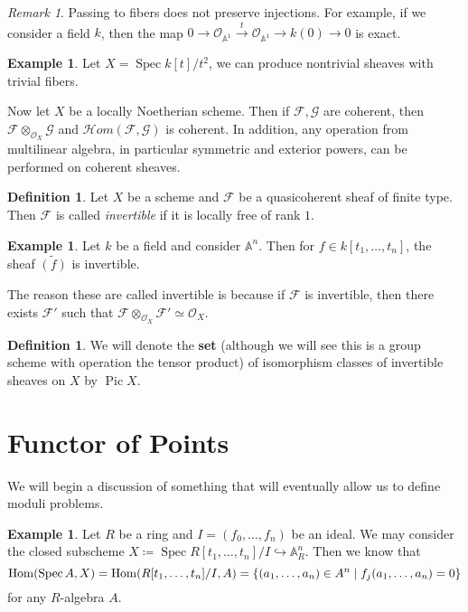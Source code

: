\documentclass[leqno, openany]{memoir}
\theoremstyle{definition}
\newtheorem{defn}[thm]{Definition}
\newtheorem{exm}[thm]{Example}
\theoremstyle{remark}
\newtheorem{rmk}[thm]{Remark}
\theoremstyle{plain}
\theoremstyle{definition}
\theoremstyle{remark}
\newcommand{\A}{\mathbb{A}}
\newcommand{\mc}[1]{\mathcal{#1}}
\newcommand{\wt}[1]{\widetilde{#1}}
\DeclareMathOperator{\Hom}{Hom}
\DeclareMathOperator{\Spec}{Spec}
\DeclareMathOperator{\Pic}{Pic}
\begin{document}
\begin{rmk} Passing to fibers does not preserve injections. For example, if we
consider a field $k$, then the map $0 \to \mc{O}_{\A^1} \xrightarrow{t}
\mc{O}_{\A^1} \to k(0) \to 0$ is exact.  \end{rmk}

\begin{exm} Let $X = \Spec k[t] / t^2$, we can produce nontrivial sheaves with
trivial fibers.  \end{exm}

Now let $X$ be a locally Noetherian scheme. Then if $\mc{F}, \mc{G}$ are
coherent, then $\mc{F} \otimes_{\mc{O}_X} \mc{G}$ and $\mc{H}om(\mc{F},
\mc{G})$ is coherent. In addition, any operation from multilinear algebra, in
particular symmetric and exterior powers, can be performed on coherent sheaves.

\begin{defn} Let $X$ be a scheme and $\mc{F}$ be a quasicoherent sheaf of
finite type. Then $\mc{F}$ is called \textit{invertible} if it is locally free
of rank $1$.  \end{defn}

\begin{exm} Let $k$ be a field and consider $\A^n$. Then for $f \in k[t_1,
\ldots, t_n]$, the sheaf $\wt{(f)}$ is invertible.  \end{exm}

The reason these are called invertible is because if $\mc{F}$ is invertible,
then there exists $\mc{F}'$ such that $\mc{F} \otimes_{\mc{O}_X} \mc{F}' \simeq
\mc{O}_X$.

\begin{defn} We will denote the \textbf{set} (although we will see this is a
group scheme with operation the tensor product) of isomorphism classes of
invertible sheaves on $X$ by $\Pic X$.  \end{defn}

\section{Functor of Points}%

We will begin a discussion of something that will eventually allow us to define
moduli problems.

\begin{exm} Let $R$ be a ring and $I = (f_0, \ldots, f_n)$ be an ideal. We may
    consider the closed subscheme $X \coloneqq \Spec R[t_1, \ldots, t_n]/I
    \hookrightarrow \A^n_R$. Then we know that \[ \Hom(\Spec A, X) =
    \Hom(R[t_1, \ldots, t_n]/I, A) = \qty{(a_1, \ldots, a_n) \in A^n \mid
f_j(a_1, \ldots, a_n) = 0} \] for any $R$-algebra $A$.  \end{exm}
\end{document}
